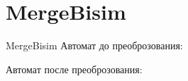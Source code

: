 \section{MergeBisim}
\begin{frame}{MergeBisim}
	Автомат до преоброзования:


	Автомат после преоброзования:


\end{frame}
